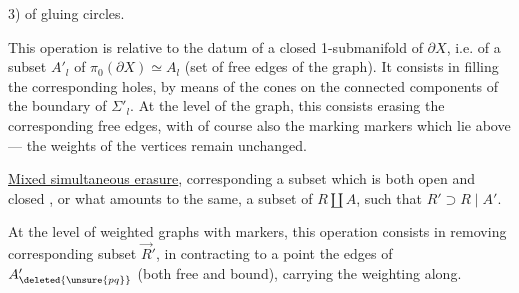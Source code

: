 3)   of gluing circles.

This operation is relative to the datum of a closed 1-submanifold of $\partial X$, i.e. of a subset $A'_l$ of $\pi_0(\partial X)\simeq A_l$ (set of free edges of the graph).
It consists in filling the corresponding holes, by means of the cones on the connected components of the boundary of $\Sigma'_l$.
At the level of the graph, this consists  erasing the corresponding free edges, with of course also the marking markers which lie above ---  the weights of the vertices remain unchanged.

\uline{Mixed simultaneous erasure},  corresponding  a subset
    
which is both open and closed  
\unsure{,}
,
\unsure{,}
or what amounts to the same, a subset  of $R\amalg A$, such that $R'\supset R\mid A'$.

At the level of weighted graphs with markers, this operation consists in removing   corresponding subset $\vec R'$, in contracting to a point the edges of $A'_{\deleted{\unsure{pq}}}$ (both free and bound), carrying the weighting along.
